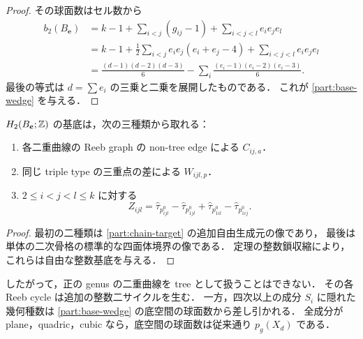 \begin{proof}
その球面数はセル数から
\begin{align*}
 b_2(B_{\boldsymbol e})
 &=k-1+\sum_{i<j}(g_{ij}-1)+\sum_{i<j<l}e_ie_je_l\\
 &=k-1+\frac12\sum_{i<j}e_ie_j(e_i+e_j-4)
          +\sum_{i<j<l}e_ie_je_l\\
 &=\frac{(d-1)(d-2)(d-3)}6
      -\sum_i\frac{(e_i-1)(e_i-2)(e_i-3)}6.
\end{align*}
最後の等式は $d=\sum e_i$ の三乗と二乗を展開したものである．
これが \eqref{part:base-wedge} を与える．
\end{proof}

\begin{corollary}[三種類の整数基底]\label{part:h2-basis}
$H_2(B_{\boldsymbol e};\mathbb Z)$ の基底は，次の三種類から取れる：
\begin{enumerate}
\item 各二重曲線の Reeb graph の non-tree edge による $C_{ij,a}$．
\item 同じ triple type の三重点の差による $W_{ijl,p}$．
\item $2\le i<j<l\le k$ に対する
\[
 Z_{ijl}=
 \widehat\tau_{p^0_{ijl}}-\widehat\tau_{p^0_{1jl}}
 +\widehat\tau_{p^0_{1il}}-\widehat\tau_{p^0_{1ij}}.
\]
\end{enumerate}
\end{corollary}

\begin{proof}
最初の二種類は \eqref{part:chain-target} の追加自由生成元の像であり，
最後は単体の二次骨格の標準的な四面体境界の像である．
定理の整数鎖収縮により，これらは自由な整数基底を与える．
\end{proof}

したがって，正の genus の二重曲線を tree として扱うことはできない．
その各 Reeb cycle は追加の整数二サイクルを生む．
一方，四次以上の成分 $S_i$ に隠れた幾何種数は
\eqref{part:base-wedge} の底空間の球面数から差し引かれる．
全成分が plane，quadric，cubic なら，底空間の球面数は従来通り $p_g(X_d)$ である．
